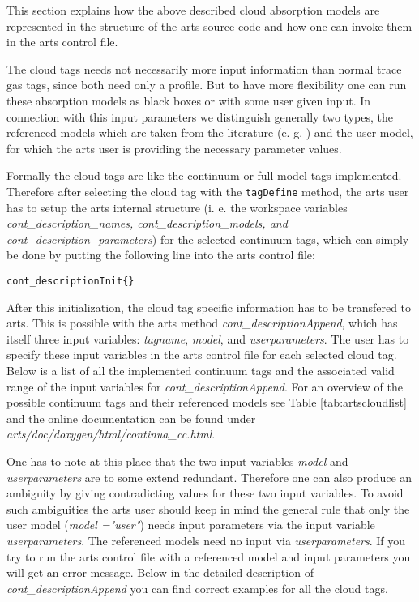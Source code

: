This section explains how the above described cloud absorption models
are represented in the structure of the arts source code and how 
one can invoke them in the arts control file.

The cloud tags needs not necessarily more input information than 
normal trace gas tags, since both need only a profile. But to have 
more flexibility one can run these absorption models as black boxes 
or with some user given input. In connection with this input parameters 
we distinguish generally two types, the referenced models which 
are taken from the literature (e. g. \cite{liebeetal:93}) and the 
user model, for which the arts user is providing the necessary 
parameter values.

Formally the cloud tags are like the 
continuum or full model tags implemented. Therefore after selecting 
the cloud tag with the {\tt tagDefine} method, the arts user has to 
setup the arts internal structure (i. e. the workspace variables 
{\it cont\_description\_names, cont\_description\_models, 
and cont\_description\_parameters}) for the selected continuum tags, 
which can simply be done by putting the following line into the 
arts control file:
\begin{verbatim}
cont_descriptionInit{}
\end{verbatim}

After this initialization, the cloud tag specific
information has to be transfered to arts. This is possible with the 
arts method {\it cont\_descriptionAppend}, which has itself 
three input variables: {\it tagname}, {\it model}, and 
{\it userparameters}. The user has to specify these input 
variables in the arts control file for each selected cloud tag. 
Below is a list of all the implemented continuum tags and the associated
valid range of the input variables for {\it cont\_descriptionAppend}. 
For an overview of the possible continuum tags and their 
referenced models see Table \ref{tab:artscloudlist} and the 
online documentation can be found under 
{\it arts/doc/doxygen/html/continua\_cc.html}.

One has to note at this place that the two input variables {\it model} and
{\it userparameters} are to some extend redundant. Therefore one can also 
produce an ambiguity by giving contradicting values for these two input variables.
To avoid such ambiguities the arts user should keep in mind the general 
rule that only the user model ({\it model ="user"}) needs input parameters 
via the input variable {\it userparameters}. The referenced models 
need no input via {\it userparameters}. If you try to run the arts control 
file with a referenced model and input parameters you will get an error message.
Below in the detailed description of {\it cont\_descriptionAppend} you 
can find correct examples for all the cloud tags.

